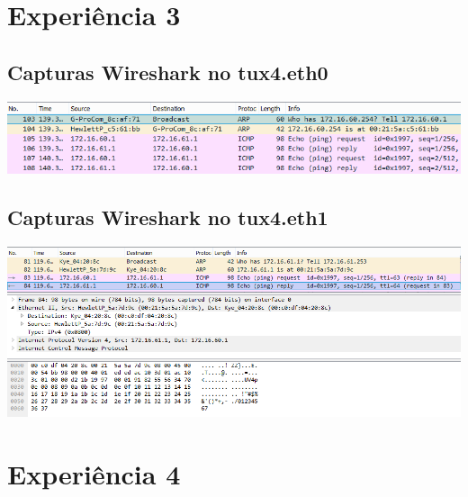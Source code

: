 \documentclass[11pt,a4paper,reqno]{report}
\numberwithin{equation}{section}
\begin{document}
\begin{appendices}
\section{Experiência 3}%

\subsection{Capturas Wireshark no tux4.eth0}
\label{ex3_eth0}
\includegraphics[width=16cm]{ex3_tux4eth0_ARP.png}

\subsection{Capturas Wireshark no tux4.eth1}
\label{ex3_eth1}
\includegraphics[width=16cm]{ex3_tux4eth1_pingdetailed.png}

\section{Experiência 4}


\end{appendices}
\end{document}
